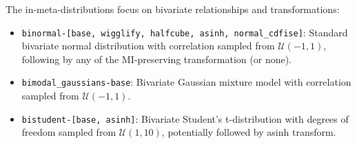 
The in-meta-distributions focus on bivariate relationships and transformations:
\begin{itemize}
    \item \texttt{binormal-[base, wigglify, halfcube, asinh, normal\_cdfise]}: Standard bivariate normal distribution with correlation sampled from $\mathcal{U}(-1, 1)$, following by any of the MI-preserving transformation (or none).
    \item \texttt{bimodal\_gaussians-base}: Bivariate Gaussian mixture model with correlation sampled from $\mathcal{U}(-1, 1)$.
    \item \texttt{bistudent-[base, asinh]}: Bivariate Student's t-distribution with degrees of freedom sampled from $\mathcal{U}(1, 10)$, potentially followed by asinh transform.
\end{itemize}

